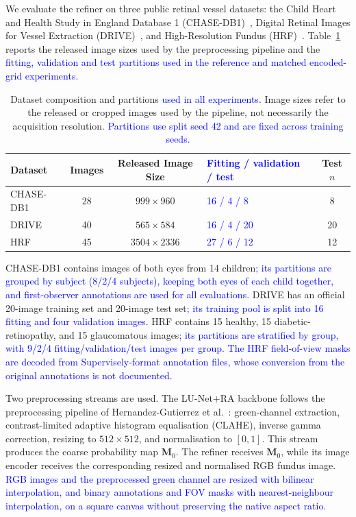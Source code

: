 \documentclass[jimaging,article,submit,pdftex,moreauthors]
  {Definitions/mdpi}
\DeclareRobustCommand{\rev}[1]{\textcolor{blue}{#1}}
\DeclareRobustCommand{\rev}[1]{#1}
\providecommand{\linelabel}[1]{}
\newcommand{\secend}[1]{\linelabel{rev:end:#1}}
\begin{document}
We evaluate the refiner on three public retinal vessel datasets: the Child Heart and Health Study in England Database 1 (CHASE-DB1)~\cite{CHASEDB1}, Digital Retinal Images for Vessel Extraction (DRIVE)~\cite{Staal2004}, and High-Resolution Fundus (HRF)~\cite{Odstrcilik2013HRF}. Table~\ref{tab:datasets} reports the released image sizes used by the preprocessing pipeline and the \rev{fitting, validation and test partitions used in the reference and matched encoded-grid experiments}.

\begin{table}[htbp]
\centering
\caption{Dataset composition and partitions \rev{used in all experiments}. Image sizes refer to the released or cropped images used by the pipeline, not necessarily the acquisition resolution. \rev{Partitions use split seed 42 and are fixed across training seeds.}}
\label{tab:datasets}
\small
\begin{tabularx}{\textwidth}{@{}l c c X c@{}}
\toprule
Dataset & Images & Released Image Size & \rev{Fitting / validation / test} & Test $n$ \\
\midrule
CHASE-DB1 & 28 & $999\times960$ & \rev{16 / 4 / 8} & 8 \\
DRIVE & 40 & $565\times584$ & \rev{16 / 4 / 20} & 20 \\
HRF & 45 & $3504\times2336$ & \rev{27 / 6 / 12} & 12 \\
\bottomrule
\end{tabularx}
\end{table}

CHASE-DB1 contains images of both eyes from 14 children\rev{; its partitions are grouped by subject (8/2/4 subjects), keeping both eyes of each child together, and first-observer annotations are used for all evaluations}. DRIVE has an official 20-image training set and 20-image test set\rev{; its training pool is split into 16 fitting and four validation images}. HRF contains 15 healthy, 15 diabetic-retinopathy, and 15 glaucomatous images\rev{; its partitions are stratified by group, with 9/2/4 fitting/validation/test images per group. The HRF field-of-view masks are decoded from Supervisely-format annotation files, whose conversion from the original annotations is not documented.}

Two preprocessing streams are used. The LU-Net+RA backbone follows the preprocessing pipeline of Hernandez-Gutierrez et al.~\cite{Hernandez2025}: green-channel extraction, contrast-limited adaptive histogram equalisation (CLAHE), inverse gamma correction, resizing to $512\times512$, and normalisation to $[0,1]$. This stream produces the coarse probability map $\mathbf{M}_0$. The refiner receives $\mathbf{M}_0$, while its image encoder receives the corresponding resized and normalised RGB fundus image. \rev{RGB images and the preprocessed green channel are resized with bilinear interpolation, and binary annotations and FOV masks with nearest-neighbour interpolation, on a square canvas without preserving the native aspect ratio.}\secend{datasets}
\end{document}
